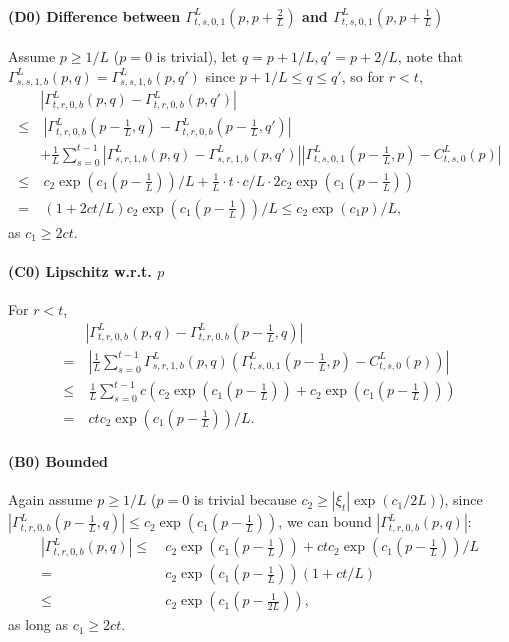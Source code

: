 \paragraph{(D0) Difference between $\Gamma^L_{t,s,0,1}(p,p+\frac2L)$ and $\Gamma^L_{t,s,0,1}(p,p+\frac1L)$ }

Assume $p\geq 1/L$ ($p=0$ is trivial), 
let $q=p+1/L, q'=p+2/L$, note that $\Gamma_{s,s,1,b}^L(p,q)=\Gamma_{s,s,1,b}^L(p,q')$ since $p+1/L\leq q\leq q'$, so for $r < t$, 
\begin{align*}
    & |\Gamma^L_{t,r,0,b}\left(p, q\right) - \Gamma^L_{t,r,0,b}\left(p, q'\right)|\\
    \leq &~|\Gamma^L_{t,r,0,b}\left(p-\frac1L, q\right) -\Gamma^L_{t,r,0,b}\left(p-\frac1L, q'\right)|  \\
     & + \frac1L \sum_{s=0}^{t-1} |\Gamma^L_{s,r,1,b}\left(p, q\right)-\Gamma^L_{s,r,1,b}\left(p, q'\right)|\left|\Gamma^L_{t,s,0,1}\left(p-\frac1L, p\right)-C^L_{t,s,0}\left(p\right)\right|\\
    \leq &~ c_2\exp(c_1(p-\frac1L)) / L + \frac1L \cdot t \cdot c/L \cdot 2c_2\exp(c_1(p-\frac1L)) \\
    = &~ (1 + 2ct/L) c_2\exp(c_1(p-\frac1L)) /L \leq c_2\exp(c_1p) /L,
\end{align*}
as $c_1\geq 2ct$.

\paragraph{(C0) Lipschitz w.r.t. $p$ } For $r < t$, 
\begin{align*}
  & |\Gamma^{L}_{t,r,0,b}(p,q) - \Gamma^{L}_{t,r,0,b}(p-\frac1L,q)|\\
  = &~ |\frac1L \sum_{s=0}^{t-1} \Gamma^L_{s,r,1,b}\left(p, q\right)\left(\Gamma^L_{t,s,0,1}\left(p-\frac1L, p\right)-C^L_{t,s,0}\left(p\right)\right)|\\
  \leq &~ \frac1L  \sum_{s=0}^{t-1} c\left(c_2\exp(c_1(p-\frac1L))+c_2\exp(c_1(p-\frac1L))\right) \\
  = &~ ctc_2\exp(c_1(p-\frac1L))/L.
\end{align*}

\paragraph{(B0) Bounded} Again assume $p\geq 1/L$ ($p=0$ is trivial because $c_2\geq |\xi_t|\exp(c_1/2L)$), since $|\Gamma^{L}_{t,r,0,b}(p-\frac1L,q)|\leq c_2\exp(c_1(p-\frac1L))$,
we can bound $|\Gamma^{L}_{t,r,0,b}(p,q)|$:
\begin{align*}
    |\Gamma^{L}_{t,r,0,b}(p,q)|\leq&~ c_2\exp(c_1(p-\frac1L))+ ctc_2\exp(c_1(p-\frac1L))/L\\
    = &~ c_2\exp(c_1(p-\frac1L))(1+ct/L)\\
    \leq &~ c_2\exp(c_1(p-\frac{1}{2L})),
\end{align*}
as long as $c_1 \geq 2ct$.

